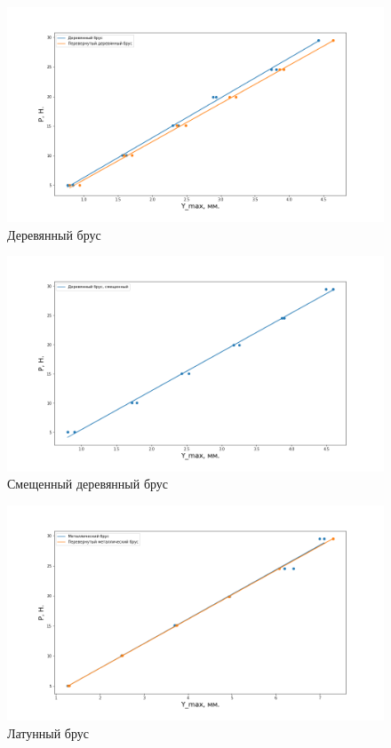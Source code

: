 \documentclass[a4paper, 12pt]{article}
\begin{document}
\begin{figure}[!h]
    \centering
    \includegraphics[width=\linewidth]{wood.png}
    \caption{Деревянный брус}
    \label{pic:wood}
\end{figure}

\begin{figure}[!h]
    \centering
    \includegraphics[width=\linewidth]{wood_moved.png}
    \caption{Смещенный деревянный брус }
    \label{pic:wood_moved}
\end{figure}

\begin{figure}[!h]
    \centering
    \includegraphics[width=\linewidth]{metal.png}
    \caption{Латунный брус}
    \label{pic:metal}
\end{figure}
\end{document}

